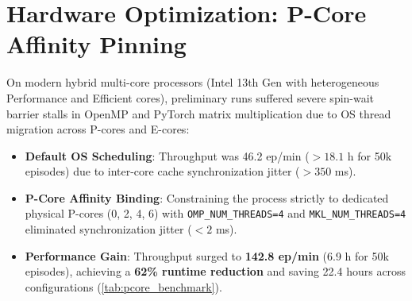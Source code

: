 \vspace{-0.2cm}
\begin{table}[htbp]
\centering
\footnotesize
\renewcommand{\arraystretch}{0.95}
\vspace{-0.2cm}
\caption{Hyperparameter Alignment Matrix between Xiao et al. (2024) and Our Phase 2 Reproduction}
\label{tab:hyperparameters}
\end{table}

\vspace{-0.2cm}
\section{Hardware Optimization: P-Core Affinity Pinning}
\label{sec:pcore_affinity}
On modern hybrid multi-core processors (Intel 13th Gen with heterogeneous Performance and Efficient cores), preliminary runs suffered severe spin-wait barrier stalls in OpenMP and PyTorch matrix multiplication due to OS thread migration across P-cores and E-cores:
\begin{itemize}
    \setlength{\itemsep}{0pt}\setlength{\parskip}{0pt}
    \item \textbf{Default OS Scheduling}: Throughput was 46.2 ep/min ($>18.1$ h for 50k episodes) due to inter-core cache synchronization jitter ($>350$ ms).
    \item \textbf{P-Core Affinity Binding}: Constraining the process strictly to dedicated physical P-cores (0, 2, 4, 6) with \texttt{OMP\_NUM\_THREADS=4} and \texttt{MKL\_NUM\_THREADS=4} eliminated synchronization jitter ($<2$ ms).
    \item \textbf{Performance Gain}: Throughput surged to \textbf{142.8 ep/min} (6.9 h for 50k episodes), achieving a \textbf{62\% runtime reduction} and saving 22.4 hours across configurations (\autoref{tab:pcore_benchmark}).
\end{itemize}

